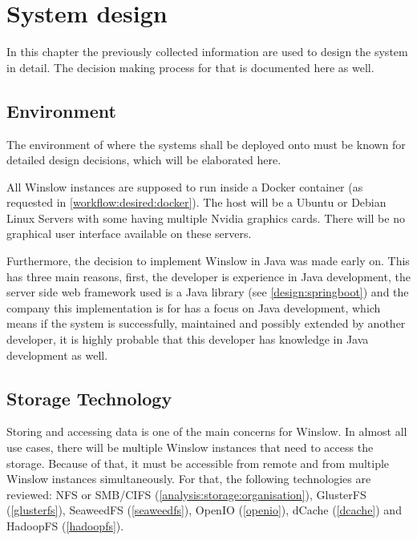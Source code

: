 \chapter{System design}

In this chapter the previously collected information are used to design the system in detail.
The decision making process for that is documented here as well.


\section{Environment}

The environment of where the systems shall be deployed onto must be known for detailed design decisions, which will be elaborated here.

All Winslow instances are supposed to run inside a Docker container (as requested in \autoref{workflow:desired:docker}).
The host will be a Ubuntu or Debian Linux Servers with some having multiple Nvidia graphics cards.
There will be no graphical user interface available on these servers.

Furthermore, the decision to implement Winslow in Java was made early on.
This has three main reasons, first, the developer is experience in Java development, the server side web framework used is a Java library (see \autoref{design:springboot}) and the company this implementation is for has a focus on Java development, which means if the system is successfully, maintained and possibly extended by another developer, it is highly probable that this developer has knowledge in Java development as well.


\section{Storage Technology}

Storing and accessing data is one of the main concerns for Winslow.
In almost all use cases, there will be multiple Winslow instances that need to access the storage.
Because of that, it must be accessible from remote and from multiple Winslow instances simultaneously.
For that, the following technologies are reviewed: NFS or SMB/CIFS (\autoref{analysis:storage:organisation}),  GlusterFS (\autoref{glusterfs}), SeaweedFS (\autoref{seaweedfs}), OpenIO (\autoref{openio}), dCache (\autoref{dcache}) and HadoopFS (\autoref{hadoopfs}).

